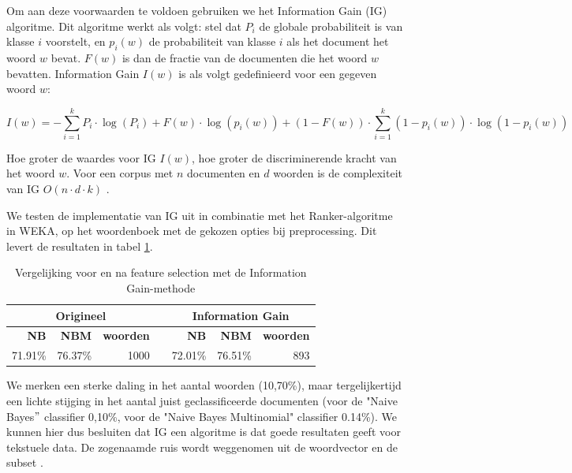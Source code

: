 Om aan deze voorwaarden te voldoen gebruiken we het Information Gain (IG) algoritme. Dit algoritme werkt als volgt: stel dat $P_i$ de globale probabiliteit is van klasse $i$ voorstelt, en $p_{i}(w)$ de probabiliteit van klasse $i$ als het document het woord $w$ bevat. $F(w)$ is dan de fractie van de documenten die het woord $w$ bevatten. Information Gain $I(w)$ is als volgt gedefinieerd voor een gegeven woord  $w$:

\begin{equation}
I(w) = -\sum_{i=1}^{k}P_i\cdot\log{(P_i)} + F(w)\cdot\log(p_i(w)) + (1 - F(w))\cdot\sum_{i=1}^{k}(1-p_i(w))\cdot\log(1-p_i(w))
\end{equation}

Hoe groter de waardes voor IG $I(w)$, hoe groter de discriminerende kracht van het woord $w$. Voor een corpus met $n$ documenten en $d$ woorden is de complexiteit van IG $O(n \cdot d \cdot k)$ \cite{Forman2003}.

We testen de implementatie van IG uit  in combinatie met het Ranker-algoritme in WEKA, op het woordenboek met de gekozen opties bij preprocessing. Dit levert de resultaten in tabel \ref{tab:feature-selection}.

\begin{table}[htbp]
	\centering
	\caption{Vergelijking voor en na feature selection met de Information Gain-methode}
	\begin{tabular}{rrrrrrr}
		\toprule
		\multicolumn{3}{c}{\textbf{Origineel}} & \multicolumn{1}{c|}{\textbf{}} & \multicolumn{3}{c}{\textbf{Information Gain}} \\
		\midrule
		\textbf{NB} & \textbf{NBM} & \textbf{woorden}    &   \multicolumn{1}{c|}{}   & \textbf{NB} & \textbf{NBM} & \textbf{woorden} \\
		71.91\% & 76.37\% & 1000  &   \multicolumn{1}{c|}{}    & 72.01\% & 76.51\% & 893 \\
		\bottomrule
	\end{tabular}%
	\label{tab:feature-selection}%
\end{table}%

We merken een sterke daling in het aantal woorden (10,70\%), maar tergelijkertijd een lichte stijging in het aantal juist geclassificeerde documenten (voor de "Naive Bayes$"$ classifier 0,10\%, voor de "Naive Bayes Multinomial" classifier 0.14\%).  We kunnen hier dus besluiten dat IG een algoritme is dat goede resultaten geeft voor tekstuele data. De zogenaamde ruis wordt weggenomen uit de woordvector en de subset .

